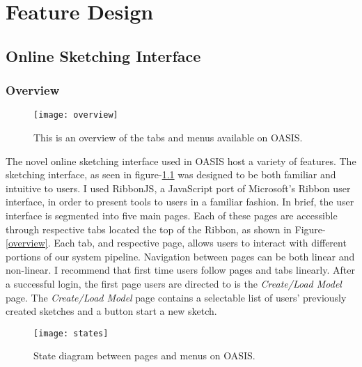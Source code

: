 \chapter{Feature Design} \label{sec:feature}

\section{Online Sketching Interface}

	\subsection{Overview}

		\begin{figure}[h]
		\centering
		\texttt{[image: overview]}
		\caption{This is an overview of the tabs and menus available on OASIS.}
		\label{fig:overview}
		\end{figure}

		The novel online sketching interface used in OASIS host a variety of features.
		The sketching interface, as seen in figure-\ref{fig:overview} was designed to be both familiar and intuitive to users.
		I used RibbonJS, a JavaScript port of Microsoft's Ribbon user interface, in order to present tools to users in a familiar fashion\cite{}. 
		In brief, the user interface is segmented into five main pages. 
		Each of these pages are accessible through respective tabs located the top of the Ribbon, as shown in Figure-\ref{overview}.
		Each tab, and respective page, allows users to interact with different portions of our system pipeline.
		Navigation between pages can be both linear and non-linear. 
		I recommend that first time users follow pages and tabs linearly. 
		After a successful login, the first page users are directed to is the \textit{Create/Load Model} page.
		The \textit{Create/Load Model} page contains a selectable list of users' previously created sketches and a button start a new sketch.\\

		\begin{figure}[h]
		\centering
		\texttt{[image: states]}
		\caption{State diagram between pages and menus on OASIS.}
		\label{fig:states}
		\end{figure}

